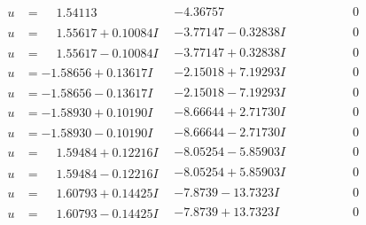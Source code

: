 \documentclass[1p]{elsarticle_modified}
\theoremstyle{definition}
\begin{document}
$$\begin{array}{c|c|c}
\begin{aligned}
u &= \phantom{-}1.54113\phantom{ +0.000000I}\end{aligned}
 & -4.36757\phantom{ +0.000000I} & \phantom{-0.000000 } 0 \\ \hline\begin{aligned}
u &= \phantom{-}1.55617 + 0.10084 I\end{aligned}
 & -3.77147 - 0.32838 I & \phantom{-0.000000 } 0 \\ \hline\begin{aligned}
u &= \phantom{-}1.55617 - 0.10084 I\end{aligned}
 & -3.77147 + 0.32838 I & \phantom{-0.000000 } 0 \\ \hline\begin{aligned}
u &= -1.58656 + 0.13617 I\end{aligned}
 & -2.15018 + 7.19293 I & \phantom{-0.000000 } 0 \\ \hline\begin{aligned}
u &= -1.58656 - 0.13617 I\end{aligned}
 & -2.15018 - 7.19293 I & \phantom{-0.000000 } 0 \\ \hline\begin{aligned}
u &= -1.58930 + 0.10190 I\end{aligned}
 & -8.66644 + 2.71730 I & \phantom{-0.000000 } 0 \\ \hline\begin{aligned}
u &= -1.58930 - 0.10190 I\end{aligned}
 & -8.66644 - 2.71730 I & \phantom{-0.000000 } 0 \\ \hline\begin{aligned}
u &= \phantom{-}1.59484 + 0.12216 I\end{aligned}
 & -8.05254 - 5.85903 I & \phantom{-0.000000 } 0 \\ \hline\begin{aligned}
u &= \phantom{-}1.59484 - 0.12216 I\end{aligned}
 & -8.05254 + 5.85903 I & \phantom{-0.000000 } 0 \\ \hline\begin{aligned}
u &= \phantom{-}1.60793 + 0.14425 I\end{aligned}
 & -7.8739 - 13.7323 I & \phantom{-0.000000 } 0 \\ \hline\begin{aligned}
u &= \phantom{-}1.60793 - 0.14425 I\end{aligned}
 & -7.8739 + 13.7323 I & \phantom{-0.000000 } 0 \\ \hline\begin{aligned}

\end{aligned}
\end{array}$$
\end{document}
